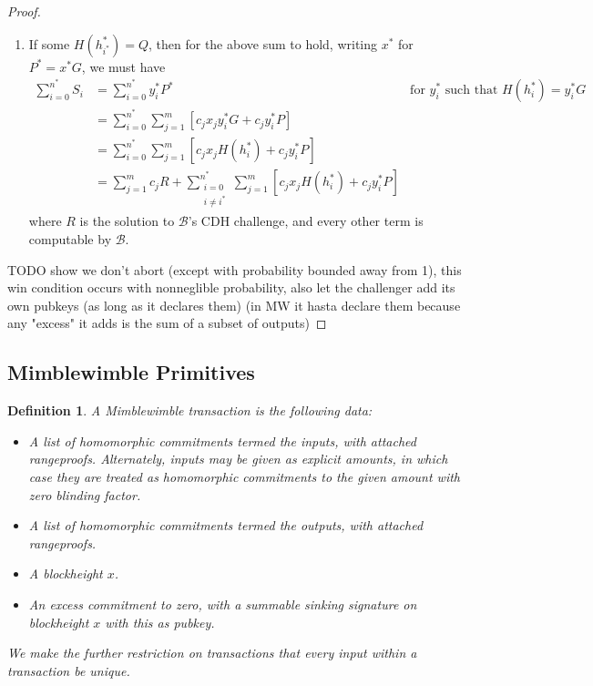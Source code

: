 \documentclass[letterpaper]{article}
\newtheorem{defn}{Definition}
\begin{document}
\begin{proof}
\begin{enumerate}
\item If some $H(h_{i^*}^*) = Q$, then for the above sum to hold, writing $x^*$
for $P^* = x^*G$, we must have
\begin{align*}
\sum_{i=0}^{n^*} S_i
    &= \sum_{i=0}^{n^*} y^*_iP^* &\text{for $y^*_i$ such that $H(h^*_i) = y^*_iG$}	\\
    &= \sum_{i=0}^{n^*} \sum_{j=1}^m [c_jx_jy^*_iG + c_jy^*_iP]	\\
    &= \sum_{i=0}^{n^*} \sum_{j=1}^m [c_jx_jH(h^*_i) + c_jy^*_iP] 	\\
    &= \sum_{j=1}^m c_j R + \sum_{\substack{i=0\\i\neq i^*}}^{n^*} \sum_{j=1}^m [c_jx_jH(h^*_i) + c_jy^*_iP]
\end{align*}
where $R$ is the solution to $\mathcal{B}$'s CDH challenge, and every other
term is computable by $\mathcal{B}$.
\end{enumerate}
TODO show we don't abort (except with probability bounded away from 1), this win condition occurs
with nonneglible probability, also let the challenger add its own pubkeys
(as long as it declares them) (in MW it hasta declare them because any
"excess" it adds is the sum of a subset of outputs)
\end{proof}

\subsection{Mimblewimble Primitives}

\begin{defn}A \emph{Mimblewimble transaction} is the following data:
\begin{itemize}
\item A list of homomorphic commitments termed the \emph{inputs},
with attached rangeproofs. Alternately, inputs may be given as
explicit amounts, in which case they are treated as homomorphic
commitments to the given amount with zero blinding factor.
\item A list of homomorphic commitments termed the \emph{outputs},
with attached rangeproofs.
\item A blockheight $x$.
\item An \emph{excess} commitment to zero, with a summable sinking
signature on blockheight $x$ with this as pubkey.
\end{itemize}
We make the further restriction on transactions that every input
within a transaction be unique.\label{defn:tx}
\end{defn}
\end{document}
